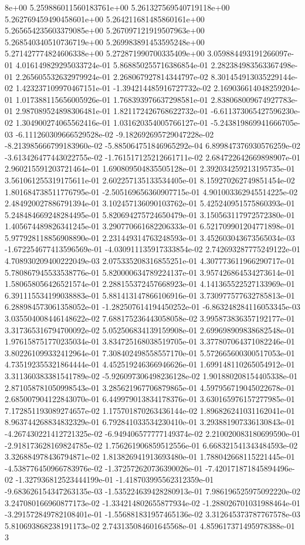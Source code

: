 8e+00	5.259886011560183761e+00	5.261327569540719118e+00	5.262769459490458601e+00	5.264211681485860161e+00	5.265654235603379085e+00	5.267097121919507963e+00	5.268540340510736719e+00	5.269983891453595248e+00	5.271427774824606338e+00	5.272871990700335409e+00
3.059884493191266097e-01	4.016149829295033724e-01	5.868850255716386854e-01	2.282384983563367498e-01	2.265605532632979924e-01	2.268067927814344797e-02	8.301454913035229144e-02	1.423237109970467151e-01	-1.394214485916727732e-02	2.169036614048259204e-01	1.017388115656005926e-01	1.768393976637298581e-01	2.838068009674927783e-01	2.987089524898306481e-01	1.821172426768622732e-01	-6.611373065427596230e-02	1.304900274065562416e-01	1.031620354005766127e-01	-5.243819869941666705e-03	-6.111260309666529528e-02	-9.182692695729047228e-02	-8.213985666799183960e-02	-5.885064751846965292e-04	6.899847376930576259e-02	-3.613426477443022755e-02	-1.761517125212661711e-02	2.684722642669898907e-01	2.960215591203721464e-01	1.690809504835505128e-01	2.392034259213195735e-01	3.561061255319175611e-01	2.602257135133534405e-01	8.159270262749851454e-02	1.801684738511776795e-01	-2.505169656360907715e-01	4.901003362945514225e-02	2.484920027886791394e-01	3.102457136090103762e-01	5.425240951575860393e-01	5.248484669248284495e-01	5.820694275724650479e-01	3.150563117972572380e-01	1.405674489826341245e-01	3.290770661682206333e-01	6.521709901204771898e-01	5.977928118856908890e-01	2.231449314763248593e-01	3.452603043673565034e-03	-1.672254677413596569e-01	-4.030911135917333854e-02	2.742693287775249122e-01	4.708930209400222049e-03	2.075335208316855251e-01	4.307773611966290717e-01	5.780867945533538776e-01	5.820000634789224137e-01	3.957426864534273614e-01	1.580658056426521574e-01	2.288155372457668923e-01	4.141365522527133969e-01	6.391115534199038883e-01	5.881413147866106916e-01	3.730977577632785813e-01	6.288984573061358052e-01	-1.282507614194450252e-01	-6.863248284116053345e-03	3.035504008446148622e-02	7.688175236443058058e-02	3.995873836357192177e-01	3.317365316794700092e-02	5.052506834139159908e-01	2.699698909838682548e-01	1.976158751770235034e-01	3.834725168038519705e-01	3.377807064371082246e-01	3.802261099332412964e-01	7.308402498558557170e-01	5.572665600300517053e-01	4.735192355321864444e-01	4.452519246366946626e-01	1.699148110265054912e-01	3.311360383381541789e-02	-5.926097306498236128e-02	1.901880208154405338e-01	2.871058781050998543e-01	3.285621967706879865e-01	4.597956719045022678e-01	2.685007904122843070e-01	6.449979013834178376e-01	3.630165976157277985e-01	7.172851193089274657e-02	1.175701870263436144e-02	1.896826241031162041e-01	8.963744268834832329e-01	6.792841033534230410e-01	3.293881907336130843e-01	-4.267430221412721325e-02	-6.949406577777149374e-02	2.210020083180699590e-01	-2.918173628169824785e-02	1.756261906859512556e-01	6.668321541343484593e-02	3.326884978436794871e-02	1.813826941913693480e-01	1.788042668115221445e-01	-4.538776450966783976e-02	-1.372572620736390026e-01	-7.420171871845894496e-02	-1.327936812523444199e-01	-1.418703995562312359e-01	-9.683626154347263135e-03	-1.535224639428280913e-01	7.986196525975092220e-02	3.247080166960877173e-02	-1.334214802655877934e-02	-1.288026701031988464e-01	-3.291572849782108401e-01	-1.556881831957465136e-02	3.312645373787767578e-03	5.810693868238191173e-02	2.743135084601645568e-01	4.859617371495978388e-01	3